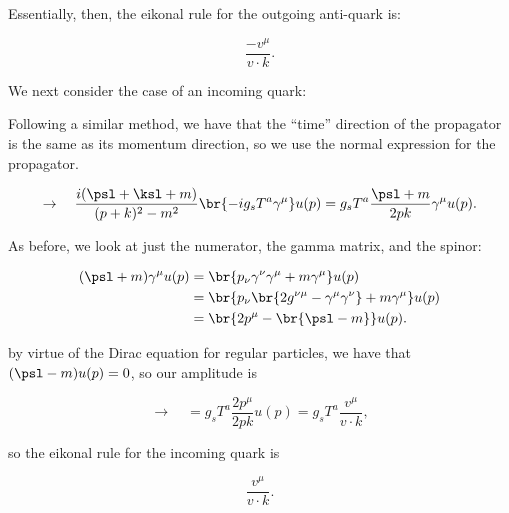 Essentially, then, the eikonal rule for the outgoing anti-quark is:

\begin{equation}
  \boxed{\frac{-v^\mu}{v \cdot k}.}
\end{equation}



We next consider the case of an incoming quark:

\begin{center}
\end{center}

Following a similar method, we have that the ``time'' direction of the propagator is the same as its momentum direction, so we use the normal expression for the propagator.

\begin{equation}
  \rightarrow\quad \frac{i(\psl + \ksl + m)}{(p+k)^2 - m^2} \br{-ig_s T^a\gamma^\mu} u(p) = g_s T^a \frac{\psl + m}{2pk} \gamma^\mu u(p).
\end{equation}


As before, we look at just the numerator, the gamma matrix, and the spinor:

\begin{align}
  (\psl+m) \gamma^\mu u(p) &= \br{p_\nu\gamma^\nu\gamma^\mu + m\gamma^\mu}u(p) \\
                           &= \br{p_\nu\br{2g^{\nu\mu} - \gamma^\mu\gamma^\nu} + m\gamma^\mu}u(p) \\
                           &= \br{2p^\mu - \br{\psl - m}}u(p).
\end{align}

by virtue of the Dirac equation for regular particles, we have that $(\psl - m)u(p) = 0$, so our amplitude is

\begin{equation}
  \rightarrow\quad = g_s T^a \frac{2p^\mu}{2pk}u(p) = g_s T^a \frac{v^\mu}{v \cdot k},
\end{equation}

so the eikonal rule for the incoming quark is

\begin{equation}
  \boxed{\frac{v^\mu}{v \cdot k}.}
\end{equation}



